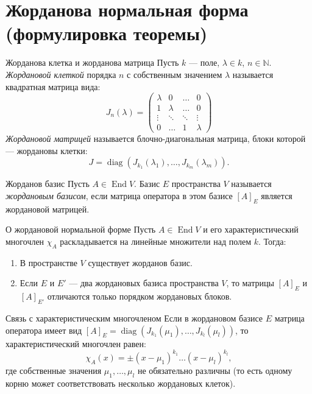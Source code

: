 
\section{Жорданова нормальная форма (формулировка теоремы)}

\begin{Definition}{Жорданова клетка и жорданова матрица}{}
	Пусть $k$ — поле, $\lambda \in k$, $n \in \mathbb{N}$. 
	\emph{Жордановой клеткой} порядка $n$ с собственным значением $\lambda$ называется квадратная матрица вида:
	\[
	J_n(\lambda) = \begin{pmatrix}
		\lambda & 0 & \dots & 0 \\
		1 & \lambda & \dots & 0 \\
		\vdots & \ddots & \ddots & \vdots \\
		0 & \dots & 1 & \lambda
	\end{pmatrix}
	\]
	\emph{Жордановой матрицей} называется блочно-диагональная матрица, блоки которой — жордановы клетки:
	\[
	J = \operatorname{diag}(J_{k_1}(\lambda_1), \dots, J_{k_m}(\lambda_m)).
	\]
\end{Definition}

\begin{Definition}{Жорданов базис}{}
	Пусть $A \in \operatorname{End} V$. Базис $E$ пространства $V$ называется \emph{жордановым базисом}, если матрица оператора в этом базисе $[A]_E$ является жордановой матрицей.
\end{Definition}

\begin{Theorem}{О жордановой нормальной форме}{}
	Пусть $A \in \operatorname{End} V$ и его характеристический многочлен $\chi_A$ раскладывается на линейные множители над полем $k$. Тогда:
	\begin{enumerate}
		\item В пространстве $V$ существует жорданов базис.
		\item Если $E$ и $E'$ — два жордановых базиса пространства $V$, то матрицы $[A]_E$ и $[A]_{E'}$ отличаются только порядком жордановых блоков.
	\end{enumerate}
\end{Theorem}

\begin{Remark}{Связь с характеристическим многочленом}{}
	Если в жордановом базисе $E$ матрица оператора имеет вид $[A]_E = \operatorname{diag}(J_{k_1}(\mu_1), \dots, J_{k_l}(\mu_l))$, то характеристический многочлен равен:
	\[
	\chi_A(x) = \pm (x - \mu_1)^{k_1} \dots (x - \mu_l)^{k_l},
	\]
	где собственные значения $\mu_1, \dots, \mu_l$ не обязательно различны (то есть одному корню может соответствовать несколько жордановых клеток).
\end{Remark}

